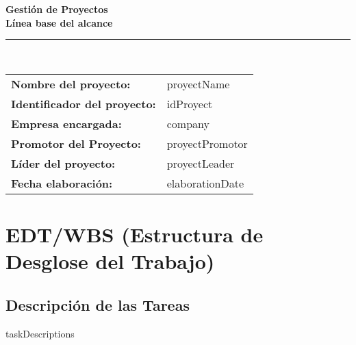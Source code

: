 \documentclass[11pt]{article}
\begin{document}
    \begin{center}
        \color{titlecolor}
        {\Huge\textbf{Gestión de Proyectos}}\\[1cm]
        {\large\textbf{Línea base del alcance}}\\[0.5cm]
        \rule{\textwidth}{1pt}\\[1.5cm]

        \begin{tabular}{>{\bfseries}ll}
            \textcolor{sectioncolor}{Nombre del proyecto:} & {{proyectName}} \\[0.4cm]
            \textcolor{sectioncolor}{Identificador del proyecto:} & {{idProyect}} \\[0.4cm]
            \textcolor{sectioncolor}{Empresa encargada:} & {{company}} \\[0.4cm]
            \textcolor{sectioncolor}{Promotor del Proyecto:} & {{proyectPromotor}} \\[0.4cm]
            \textcolor{sectioncolor}{Líder del proyecto:} & {{proyectLeader}} \\[0.4cm]
            \textcolor{sectioncolor}{Fecha elaboración:} & {{elaborationDate}} \\
        \end{tabular}
    \end{center}
    \thispagestyle{empty}
    \newpage

    \tableofcontents
    \thispagestyle{empty}
    \newpage
    

    \section{EDT/WBS (Estructura de Desglose del Trabajo)}
    \begin{center}
    \end{center}


    \subsection{Descripción de las Tareas}
    \begin{description}
        {{taskDescriptions}}
    \end{description}
\end{document}
